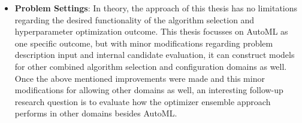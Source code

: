 \begin{itemize}
    \item \textbf{Problem Settings}: In theory, the approach of this thesis has no limitations regarding the desired functionality of the algorithm selection and hyperparameter optimization outcome.
    This thesis focusses on AutoML as one specific outcome, but with minor modifications regarding problem description input and internal candidate evaluation, it can construct models for other combined algorithm selection and configuration domains as well.\newline
    Once the above mentioned improvements were made and this minor modifications for allowing other domains as well, an interesting follow-up research question is to evaluate how the optimizer ensemble approach performs in other domains besides AutoML.
\end{itemize}
